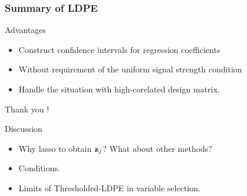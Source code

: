 \begin{frame}
    \frametitle{Summary of LDPE}
    \begin{block}{Advantages}
        \begin{itemize}
        \item Construct confidence intervals for regression coefficients
        \item Without requirement of the uniform signal strength condition
        \item Handle the situation with high-corelated design matrix. 
        \end{itemize}
    \end{block}


    \vspace{24pt}

\begin{flushright}
    Thank you !
\end{flushright}

\end{frame}

\begin{frame}{Discussion}
    \begin{itemize}
        \item Why lasso to obtain $\mbox{\bf z}_j$? What about other methods?
        \item Conditions. 
        \item Limits of Thresholded-LDPE in variable selection.
    \end{itemize}


\end{frame}
